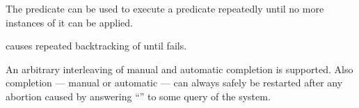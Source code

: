 \noindent
The  predicate can be used to execute a predicate repeatedly 
until no more instances of it can be applied.\bigskip

\begin{command}
causes repeated backtracking of  until  fails.
\end{command}

\noindent
An arbitrary interleaving of manual and automatic completion is supported. Also
completion --- manual or automatic --- can always safely be restarted after any
abortion caused by answering ``'' to some query of the system.





